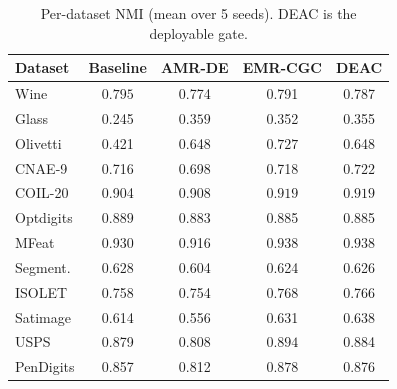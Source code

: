 \begin{table}[htbp]
\centering
\caption{Per-dataset NMI (mean over 5 seeds). DEAC is the deployable gate.}
\label{tab:nmi_per_dataset}
\footnotesize
\setlength{\tabcolsep}{4pt}
\begin{tabular}{lcccc}
\toprule
Dataset & Baseline & AMR-DE & EMR-CGC & \textbf{DEAC} \\
\midrule
Wine & $\mathbf{0.795}$ & 0.774 & 0.791 & 0.787 \\
Glass & 0.245 & $\mathbf{0.359}$ & 0.352 & 0.355 \\
Olivetti & 0.421 & 0.648 & $\mathbf{0.727}$ & 0.648 \\
CNAE-9 & 0.716 & 0.698 & 0.718 & $\mathbf{0.722}$ \\
COIL-20 & 0.904 & 0.908 & $\mathbf{0.919}$ & $\mathbf{0.919}$ \\
Optdigits & $\mathbf{0.889}$ & 0.883 & 0.885 & 0.885 \\
MFeat & 0.930 & 0.916 & $\mathbf{0.938}$ & $\mathbf{0.938}$ \\
Segment. & $\mathbf{0.628}$ & 0.604 & 0.624 & 0.626 \\
ISOLET & 0.758 & 0.754 & $\mathbf{0.768}$ & 0.766 \\
Satimage & 0.614 & 0.556 & 0.631 & $\mathbf{0.638}$ \\
USPS & 0.879 & 0.808 & $\mathbf{0.894}$ & 0.884 \\
PenDigits & 0.857 & 0.812 & $\mathbf{0.878}$ & 0.876 \\
\bottomrule
\end{tabular}
\end{table}
